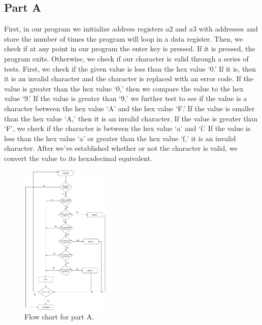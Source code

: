\documentclass[10pt, letterpaper, titlepage]{article} %
\begin{document}
\begin{multicols*}{2}
\subsection{Part A}
First, in our program we initialize address registers $a2$ and $a3$ with addresses and store the number of times the program will loop in a data register. 
Then, we check if at any point in our program the enter key is pressed. 
If it is pressed, the program exits. 
Otherwise, we check if our character is valid through a series of tests. 
First, we check if the given value is less than the hex value `0.'
If it is, then it is an invalid character and the character is replaced with an error code. 
If the value is greater than the hex value `0,' then we compare the value to the hex value `9.'
If the value is greater than `9,' we further test to see if the value is a character between the hex value `A' and the hex value `F.'
If the value is smaller than the hex value `A,' then it is an invalid character. 
If the value is greater than `F', we check if the character is between the hex value `a' and `f.' 
If the value is less than the hex value `a' or greater than the hex value `f,' it is an invalid character. After we've established whether or not the character is valid, we convert the value to its hexadecimal equivalent.

\begin{figure}[H]
   \includegraphics[width=0.38\textwidth]{PartADiagram.png}
   \centering  
   \caption{Flow chart for part A.} 
   \label{figure:1}
\end{figure}


\end{multicols*}
\end{document}
